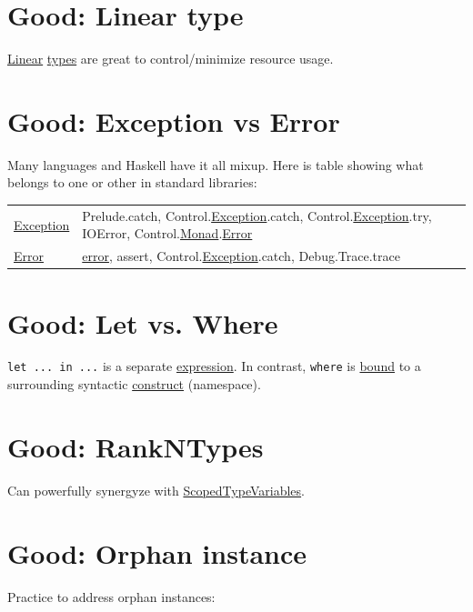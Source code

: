 \documentclass[a4paper,14pt,oneside]{book}
\begin{document}
{\chapter{\label{org34ad55c}Good: Linear type}
\label{sec:org65ce87a}
\hyperref[org059a25a]{Linear} \hyperref[org51532d9]{types} are great to control/minimize resource usage.\\

\chapter{\label{org67b03aa}Good: Exception vs Error}
\label{sec:org388ad04}
Many languages and Haskell have it all mixup. Here is table showing what belongs to one or other in standard libraries:\\

\begin{center}
\begin{tabular}{ll}
\hline
\hyperref[org617291e]{Exception} & Prelude.catch, Control.\hyperref[org617291e]{Exception}.catch, Control.\hyperref[org617291e]{Exception}.try, IOError, Control.\hyperref[org90c21ab]{Monad}.\hyperref[orgb40c72e]{Error}\\
\hyperref[orgb40c72e]{Error} & \hyperref[orgb40c72e]{error}, assert, Control.\hyperref[org617291e]{Exception}.catch, Debug.Trace.trace\\
\end{tabular}
\end{center}

\chapter{\label{org07cf3a5}Good: Let vs. Where}
\label{sec:org48ab015}
\texttt{let ... in ...} is a separate \hyperref[org4f4ad69]{expression}. In contrast, \texttt{where} is \hyperref[orgda0d3e7]{bound} to a surrounding syntactic \hyperref[orgadd667a]{construct} (namespace).\\

\chapter{\label{org2cebafb}Good: RankNTypes}
\label{sec:org67af9c0}
Can powerfully synergyze with \hyperref[org9ff180d]{ScopedTypeVariables}.\\

\chapter{\label{org90d93f9}Good: Orphan instance}
\label{sec:org5d4a73b}
Practice to address orphan instances:\\

}
\end{document}
